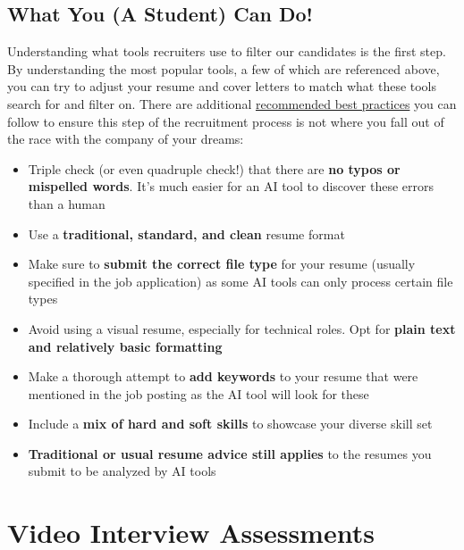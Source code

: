 \documentclass[
]{book}
\begin{document}
\hypertarget{what-you-a-student-can-do-1}{%
\section{What You (A Student) Can Do!}\label{what-you-a-student-can-do-1}}

Understanding what tools recruiters use to filter our candidates is the first step. By understanding the most popular tools, a few of which are referenced above, you can try to adjust your resume and cover letters to match what these tools search for and filter on. There are additional \href{https://www.indeed.com/career-advice/resumes-cover-letters/resume-ai\#:~:text=Instead\%20of\%20using\%20a\%20visual,this\%20kind\%20of\%20complex\%20information.}{recommended best practices} you can follow to ensure this step of the recruitment process is not where you fall out of the race with the company of your dreams:

\begin{itemize}
\item
  Triple check (or even quadruple check!) that there are \textbf{no typos or mispelled words}. It's much easier for an AI tool to discover these errors than a human
\item
  Use a \textbf{traditional, standard, and clean} resume format
\item
  Make sure to \textbf{submit the correct file type} for your resume (usually specified in the job application) as some AI tools can only process certain file types
\item
  Avoid using a visual resume, especially for technical roles. Opt for \textbf{plain text and relatively basic formatting}
\item
  Make a thorough attempt to \textbf{add keywords} to your resume that were mentioned in the job posting as the AI tool will look for these
\item
  Include a \textbf{mix of hard and soft skills} to showcase your diverse skill set
\item
  \textbf{Traditional or usual resume advice still applies} to the resumes you submit to be analyzed by AI tools
\end{itemize}

\hypertarget{video-interview-assessments}{%
\chapter{Video Interview Assessments}\label{video-interview-assessments}}
\end{document}
